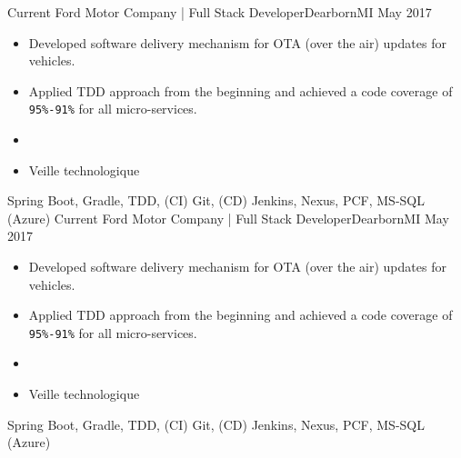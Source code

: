 \begin{experiences}
  \experience
    {Current}   {Ford Motor Company | Full Stack Developer}{Dearborn}{MI}
    {May 2017} {
                      \begin{itemize}
                        \item Developed software delivery mechanism for OTA (over the air) updates for vehicles.                        
                        \item Applied TDD approach from the beginning and achieved a code coverage of \texttt{95\%-91\%} for all micro-services.               
                        \item                 
                        \item Veille technologique                                                                    
                      \end{itemize}
                    }
                    {Spring Boot, Gradle, TDD, (CI) Git, (CD) Jenkins, Nexus, PCF, MS-SQL (Azure)}
  \emptySeparator
    \experience
    {Current}   {Ford Motor Company | Full Stack Developer}{Dearborn}{MI}
    {May 2017} {
                      \begin{itemize}
                        \item Developed software delivery mechanism for OTA (over the air) updates for vehicles.                        
                        \item Applied TDD approach from the beginning and achieved a code coverage of \texttt{95\%-91\%} for all micro-services.               
                        \item                 
                        \item Veille technologique                                                                    
                      \end{itemize}
                    }
                    {Spring Boot, Gradle, TDD, (CI) Git, (CD) Jenkins, Nexus, PCF, MS-SQL (Azure)}
  \emptySeparator
  

\end{experiences}
